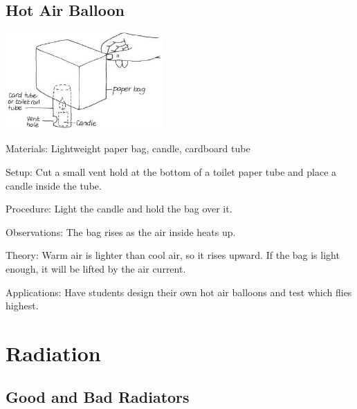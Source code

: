 \begin{multicols}{2}
\subsection{Hot Air Balloon}

\begin{center}
\includegraphics[width=0.45\textwidth]{./img/vso/hot-air-balloon.jpg}
\end{center}

\begin{description*}
\item[Materials:]{Lightweight paper bag, candle, cardboard tube}
\item[Setup:]{Cut a small vent hold at the bottom of a toilet paper tube and place a candle inside the tube.}
\item[Procedure:]{Light the candle and hold the bag over it.}
\item[Observations:]{The bag rises as the air inside heats up.}
\item[Theory:]{Warm air is lighter than cool air, so it rises upward. If the bag is light enough, it will be lifted by the air current.}
\item[Applications:]{Have students design their own hot air balloons and test which flies highest.}
\end{description*}


\section*{Radiation} 


\subsection{Good and Bad Radiators}


\end{multicols}
